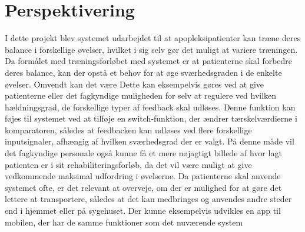 \section{Perspektivering}
I dette projekt blev systemet udarbejdet til at apopleksipatienter kan træne deres balance i forskellige øvelser, hvilket i sig selv gør det muligt at variere træningen. Da formålet med træningsforløbet med systemet er at patienterne skal forbedre deres balance, kan der opstå et behov for at øge sværhedsgraden i de enkelte øvelser. Omvendt kan det være  Dette kan eksempelvis gøres ved at give patienterne eller det fagkyndige muligheden for selv at regulere ved hvilken hældningsgrad, de forskellige typer af feedback skal udløses. Denne funktion kan føjes til systemet ved at tilføje en switch-funktion, der ændrer tærskelværdierne i komparatoren, således at feedbacken kan udløses ved flere forskellige inputsignaler, afhængig af hvilken sværhedsgrad der er valgt. På denne måde vil det fagkyndige personale også kunne få et mere nøjagtigt billede af hvor lagt patienten er i sit rehabiliteringsforløb, da det vil være muligt at give vedkommende maksimal udfordring i øvelserne.
Da patienterne skal anvende systemet ofte, er det relevant at overveje, om der er mulighed for at gøre det lettere at transportere, således at det kan medbringes og anvendes andre steder end i hjemmet eller på sygehuset. Der kunne eksempelvis udvikles en app til mobilen, der har de samme funktioner som det nuværende system 